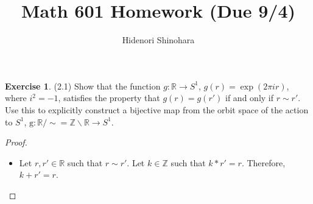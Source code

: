 \documentclass[12pt, psamsfonts]{amsart}
\theoremstyle{definition}
\newtheorem*{exer}{Exercise}
\theoremstyle{remark}
\numberwithin{equation}{section}
\begin{document}
\title{Math 601 Homework (Due 9/4)}
\author{Hidenori Shinohara}
\maketitle

\begin{exer}{(2.1)}
  Show that the function $g: \mathbb{R} \rightarrow S^1$, $g(r) = \exp(2\pi ir)$, where $i^2 = -1$, satisfies the property that $g(r) = g(r')$ if and only if $r \sim r'$.
  Use this to explicitly construct a bijective map from the orbit space of the action to $S^1$, $\mathrm{g}: \mathbb{R} / \sim= \mathbb{Z} \backslash \mathbb{R} \rightarrow S^1$.
\end{exer}

\begin{proof}
$ $
  \begin{itemize}
    \item
      Let $r, r' \in \mathbb{R}$ such that $r \sim r'$.
      Let $k \in \mathbb{Z}$ such that $k * r' = r$.
      Therefore, $k + r' = r$.


\end{itemize}
\end{proof}
\end{document}
